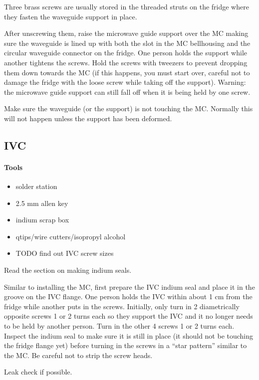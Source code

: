Three brass screws are usually stored in the threaded struts on the fridge where they fasten the waveguide support in place.

After unscrewing them, raise the microwave guide support over the MC making sure the waveguide is lined up with both the slot in the MC bellhousing and the circular waveguide connector on the fridge.  One person holds the support while another tightens the screws.  Hold the screws with tweezers to prevent dropping them down towards the MC (if this happens, you must start over, careful not to damage the fridge with the loose screw while taking off the support).  Warning: the microwave guide support can still fall off when it is being held by one screw.

Make sure the waveguide (or the support) is not touching the MC.  Normally this will not happen unless the support has been deformed.

  \subsection{IVC}

\paragraph{Tools}
\begin{itemize}
 \item solder station
\item 2.5 mm allen key
\item indium scrap box
\item qtips/wire cutters/isopropyl alcohol
\item TODO find out IVC screw sizes
\end{itemize}

Read the section on making indium seals.

Similar to installing the MC, first prepare the IVC indium seal and place it in the groove on the IVC flange.  One person holds the IVC within about 1 cm from the fridge while another puts in the screws.  Initially, only turn in 2 diametrically opposite screws 1 or 2 turns each so they support the IVC and it no longer needs to be held by another person.  Turn in the other 4 screws 1 or 2 turns each.  Inspect the indium seal to make sure it is still in place (it should not be touching the fridge flange yet) before turning in the screws in a ``star pattern'' similar to the MC.  Be careful not to strip the screw heads.


Leak check if possible.


